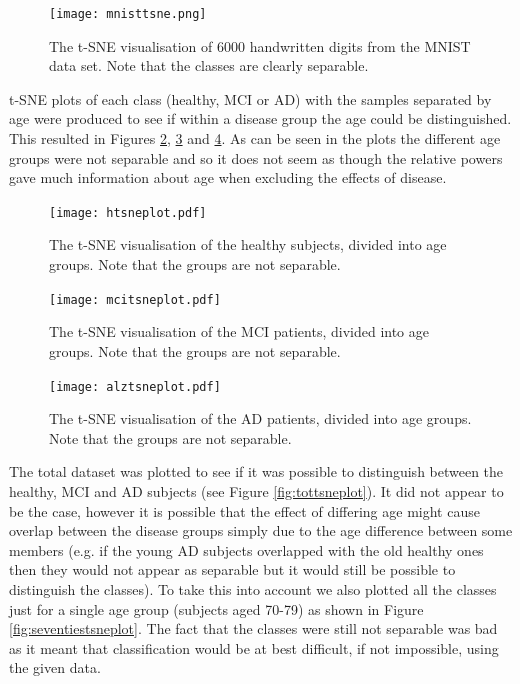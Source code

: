 \begin{figure}[h!]
  \centering
    \texttt{[image: mnisttsne.png]}
    \caption{The t-SNE visualisation of 6000 handwritten digits from the MNIST data set.\cite{Maaten2008} Note that the classes are clearly separable.}
    \label{fig:mnisttsne}
\end{figure}


t-SNE plots of each class (healthy, MCI or AD) with the samples separated by age were produced to see if within a disease group the age could be distinguished. This resulted in Figures \ref{fig:htsneplot}, \ref{fig:mcitsneplot} and \ref{fig:alztsneplot}. As can be seen in the plots the different age groups were not separable and so it does not seem as though the relative powers gave much information about age when excluding the effects of disease.


\begin{figure}[h!]
  \centering
    \texttt{[image: htsneplot.pdf]}
    \caption{The t-SNE visualisation of the healthy subjects, divided into age groups. Note that the groups are not separable.}
    \label{fig:htsneplot}
\end{figure}


\begin{figure}[h!]
  \centering
    \texttt{[image: mcitsneplot.pdf]}
    \caption{The t-SNE visualisation of the MCI patients, divided into age groups. Note that the groups are not separable.}
    \label{fig:mcitsneplot}
\end{figure}


\begin{figure}[h!]
  \centering
    \texttt{[image: alztsneplot.pdf]}
    \caption{The t-SNE visualisation of the AD patients, divided into age groups. Note that the groups are not separable.}
    \label{fig:alztsneplot}
\end{figure}


The total dataset was plotted to see if it was possible to distinguish between the healthy, MCI and AD subjects (see Figure \ref{fig:tottsneplot}). It did not appear to be the case, however it is possible that the effect of differing age might cause overlap between the disease groups simply due to the age difference between some members (e.g. if the young AD subjects overlapped with the old healthy ones then they would not appear as separable but it would still be possible to distinguish the classes). To take this into account we also plotted all the classes just for a single age group (subjects aged 70-79) as shown in Figure \ref{fig:seventiestsneplot}. The fact that the classes were still not separable was bad as it meant that classification would be at best difficult, if not impossible, using the given data.


